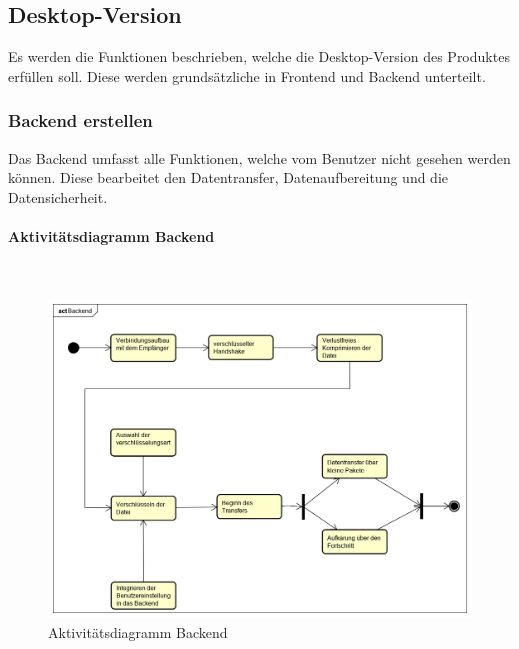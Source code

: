 \subsection{Desktop-Version}
Es werden die Funktionen beschrieben, welche die Desktop-Version des Produktes erfüllen soll. Diese werden grundsätzliche in Frontend und Backend unterteilt.
\subsubsection{Backend erstellen}
Das Backend umfasst alle Funktionen, welche vom Benutzer nicht gesehen werden können. Diese bearbeitet den Datentransfer, Datenaufbereitung und die Datensicherheit.
\paragraph{Aktivitätsdiagramm Backend}\mbox{}\\
\begin{figure}[H]
	\centering
	\includegraphics[width= 0.9\linewidth]{diagramms/activity/Backend.png}
	\caption{Aktivitätsdiagramm Backend}
\end{figure}
\newpage
